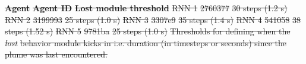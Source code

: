 \documentclass[5p,twocolumn,authoryear]{elsarticle}
\providecommand{\DIFdeltex}[1]{{\protect\color{red}\sout{#1}}}                      %
\providecommand{\DIFdelbegin}{} %
\providecommand{\DIFdelend}{} %
\providecommand{\DIFdelFL}[1]{\DIFdel{#1}} %
\providecommand{\DIFdel}[1]{\texorpdfstring{\DIFdeltex{#1}}{}} %
\newcommand{\DIFscaledelfig}{0.5}
\newlength{\DIFdelgraphicswidth} %
\newlength{\DIFdelgraphicsheight} %
\newcommand{\DIFdelincludegraphics}[2][]{%
\sbox{\DIFdelgraphicsbox}{\DIFOincludegraphics[#1]{#2}}%
\settoboxwidth{\DIFdelgraphicswidth}{\DIFdelgraphicsbox} %
\settoboxtotalheight{\DIFdelgraphicsheight}{\DIFdelgraphicsbox} %
\scalebox{\DIFscaledelfig}{%
\parbox[b]{\DIFdelgraphicswidth}{\usebox{\DIFdelgraphicsbox}\\[-\baselineskip] \rule{\DIFdelgraphicswidth}{0em}}\llap{\resizebox{\DIFdelgraphicswidth}{\DIFdelgraphicsheight}{%
\setlength{\unitlength}{\DIFdelgraphicswidth}%
\begin{picture}(1,1)%
\thicklines\linethickness{2pt} %
{\color[rgb]{1,0,0}\put(0,0){\framebox(1,1){}}}%
{\color[rgb]{1,0,0}\put(0,0){\line( 1,1){1}}}%
{\color[rgb]{1,0,0}\put(0,1){\line(1,-1){1}}}%
\end{picture}%
}\hspace*{3pt}}} %
} %
\DeclareRobustCommand{\DIFdelbegin}{\DIFOdelbegin \let\includegraphics\DIFdelincludegraphics} %
\DeclareRobustCommand{\DIFdelend}{\DIFOaddend \let\includegraphics\DIFOincludegraphics} %
\begin{document}
\DIFdelbegin %
\textbf{\DIFdelFL{Agent}} %
\textbf{\DIFdelFL{Agent ID}} %
\textbf{\DIFdelFL{Lost module threshold}}   %
\DIFdelFL{RNN 1 }%
\DIFdelFL{2760377 }%
\DIFdelFL{30 steps (1.2 s) }%
\DIFdelFL{RNN 2 }%
\DIFdelFL{3199993 }%
\DIFdelFL{25 steps (1.0 s) }%
\DIFdelFL{RNN 3 }%
\DIFdelFL{3307e9 }%
\DIFdelFL{35 steps (1.4 s) }%
\DIFdelFL{RNN 4 }%
\DIFdelFL{541058 }%
\DIFdelFL{38 steps (1.52 s) }%
\DIFdelFL{RNN 5 }%
\DIFdelFL{9781ba }%
\DIFdelFL{25 steps (1.0 s) }%
{%
\DIFdelFL{Thresholds for defining when the }\textit{\DIFdelFL{lost}} %
\DIFdelFL{behavior module kicks in i.e. duration (in timesteps or seconds) since the plume was last encountered.}}
\DIFdelend %
\end{document}

